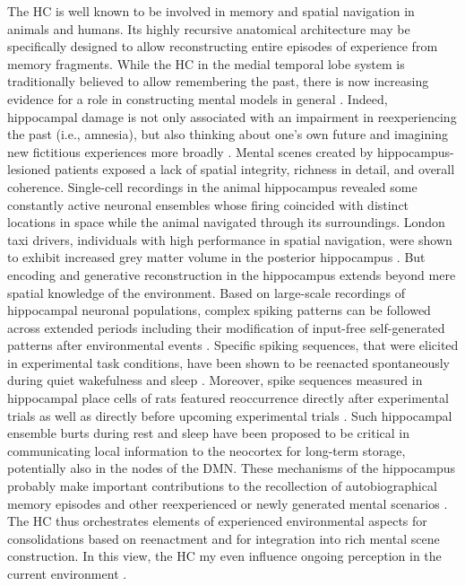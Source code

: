 \documentclass{article} %
\begin{document}
The HC is well known to be involved in memory and
spatial navigation in animals and humans.
Its highly recursive anatomical architecture
may be specifically designed to allow reconstructing
entire episodes of experience from memory fragments.
%
While the HC in the medial temporal lobe system
is traditionally believed to allow remembering the past,
there is now increasing evidence for a role
in constructing mental models in general
\citep{maguire2016, schacter2007remembering}.
Indeed,
hippocampal damage is
not only associated with an impairment in reexperiencing the past (i.e., amnesia),
but also thinking about one’s own future and
imagining new fictitious experiences more broadly \citep{hassabis2007patients}.
Mental scenes created by hippocampus-lesioned patients exposed a lack of
spatial integrity, richness in detail, and overall coherence.
%
Single-cell recordings in the animal hippocampus revealed
some constantly active neuronal ensembles whose firing coincided with
distinct locations in space while the animal navigated through its surroundings.
London taxi drivers, individuals with high performance in spatial navigation,
were shown to exhibit increased grey matter volume in the
posterior hippocampus \citep{maguire2000navigation}.
But encoding and generative reconstruction in the hippocampus extends
beyond mere spatial knowledge of the environment.
Based on large-scale recordings of hippocampal neuronal populations,
complex spiking patterns can be followed across extended periods including
their modification of input-free self-generated patterns
after environmental events \citep{buzsaki2004large}.
Specific spiking sequences, that were elicited in experimental task conditions,
have been shown to be reenacted spontaneously during
quiet wakefulness and sleep \citep{hartley2014space}.
Moreover, spike sequences measured in hippocampal place cells of rats
featured reoccurrence directly after experimental trials
as well as directly before upcoming experimental trials \citep{diba2007forward}.
Such hippocampal ensemble burts during rest and sleep
have been proposed to be critical in communicating local information
to the neocortex for long-term storage, potentially also in the nodes of the DMN.
These mechanisms of the hippocampus probably make important contributions to the
recollection of autobiographical memory episodes and other
reexperienced or newly generated mental scenarios
\citep{hassabis2007patients}.
%
The HC thus orchestrates elements of experienced environmental aspects for
consolidations based on reenactment and for integration into
rich mental scene construction. In this view, the HC my even influence
ongoing perception in the current environment
\citep{maguire2016}.
\end{document}
